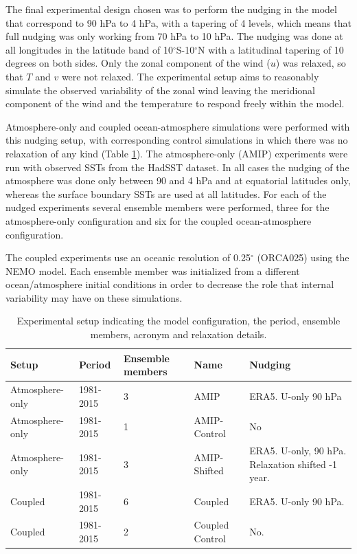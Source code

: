
The final experimental design chosen was to perform the nudging in the model that correspond to 90 hPa to 4 hPa, with a tapering of 4 levels, which means that full nudging was only working from 70 hPa to 10 hPa. The nudging was done at all longitudes in the latitude band of 10$^\circ$S-10$^\circ$N with a latitudinal tapering of 10 degrees on both sides. Only the zonal component of the wind ($u$) was relaxed, so that $T$ and $v$ were not relaxed. 
The experimental setup aims to reasonably simulate the observed variability of the zonal wind leaving the meridional component of the wind and the temperature to respond freely within the model. 

Atmosphere-only and coupled ocean-atmosphere simulations were performed with this nudging setup, with corresponding control simulations in which there was no relaxation of any kind (Table \ref{tab:nudg_exps}). The atmosphere-only (AMIP) experiments were run with observed SSTs from the HadSST dataset. In all cases the nudging of the atmosphere was done only between 90 and 4 hPa and at equatorial latitudes only, whereas the surface boundary SSTs are used at all latitudes.
For each of the nudged experiments several ensemble members were performed, three for the atmosphere-only configuration and six for the coupled ocean-atmosphere configuration. 

The coupled experiments use an oceanic resolution of 0.25$^\circ$ (ORCA025) using the NEMO model. Each ensemble member was initialized from a different ocean/atmosphere initial conditions in order to decrease the role that internal variability may have on these simulations. 

\begin{table}[t!]
\caption{Experimental setup indicating the model configuration, the period, ensemble members, acronym and relaxation details.}
\begin{tabular}{p{2.3cm}|p{2.3cm}|p{1.73cm}|p{3cm}|p{5cm}} \label{tab:nudg_exps}
Setup           & Period    & Ensemble members & Name            & Nudging                                          \\ \hline \hline
Atmosphere-only & 1981-2015 & 3                & AMIP            & ERA5. U-only 90 hPa                              \\
Atmosphere-only & 1981-2015 & 1                & AMIP-Control    & No                                               \\
Atmosphere-only & 1981-2015 & 3                & AMIP-Shifted    & ERA5. U-only, 90 hPa. Relaxation shifted -1 year. \\
Coupled         & 1981-2015 & 6                & Coupled         & ERA5. U-only 90 hPa.                             \\
Coupled         & 1981-2015 & 2                & Coupled Control & No.                                             
\end{tabular}
\end{table}

